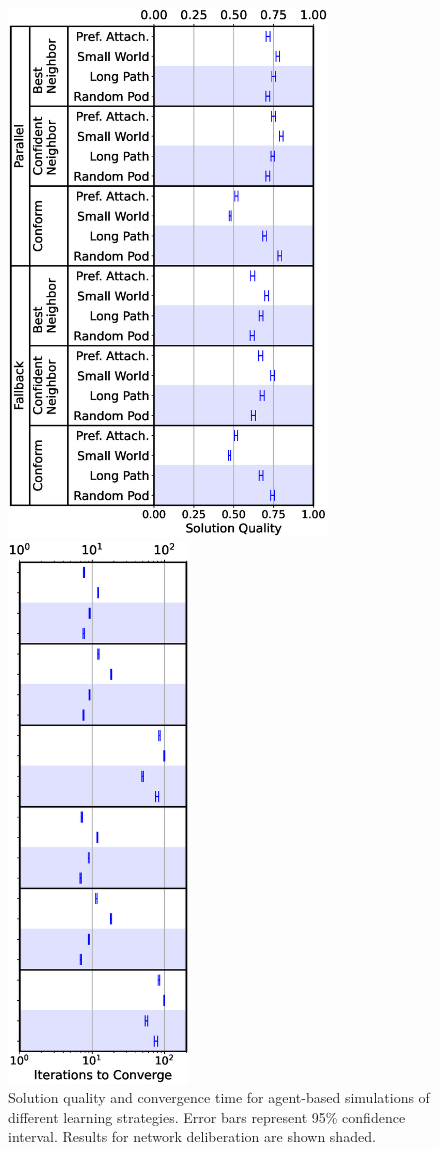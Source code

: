 \documentclass[twocolumn,10pt]{article}
\begin{document}
\begin{figure}[]
    \label{fig:results}
    \centering
    \begin{minipage}{3.33in}
        \centering
        \includegraphics[width=3.33in]{fig-perf-both.eps}
    \end{minipage}%
    \begin{minipage}{1.875in}
    \centering
    \includegraphics[width=1.875in]{fig-converge-both.eps}
    \end{minipage}
\caption{
Solution quality and convergence time for agent-based simulations of different learning strategies. Error bars represent 95\% confidence interval. Results for network deliberation are shown shaded.
}
\end{figure}
\end{document}
